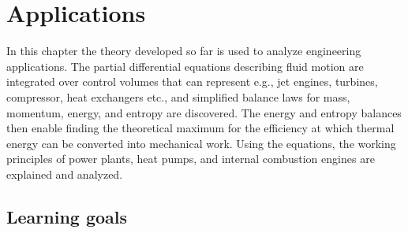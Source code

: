 \chapter{Applications}
In this chapter the theory developed so far is used to analyze engineering applications. The partial differential equations describing fluid motion are integrated over control volumes that can represent e.g., jet engines, turbines, compressor, heat exchangers etc., and simplified balance laws for mass, momentum, energy, and entropy are discovered. The energy and entropy balances then enable finding the theoretical maximum for the efficiency at which thermal energy can be converted into mechanical work. Using the equations, the working principles of power plants, heat pumps, and internal combustion engines are explained and analyzed.

\section{Learning goals}
